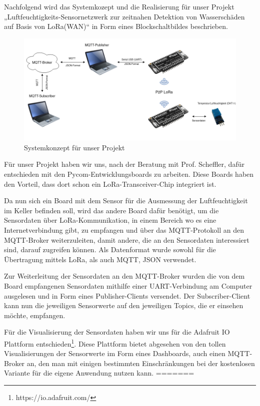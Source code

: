 Nachfolgend wird das Systemkozept und die Realisierung für unser Projekt „Luftfeuchtigkeits-Sensornetzwerk zur zeitnahen Detektion von Wasserschäden auf Basis von LoRa(WAN)“ in Form eines Blockschaltbildes beschrieben. 

\begin{figure}[h]
 \centering
 \includegraphics[width=1\textwidth]{pictures/Blockschaltbild_ProNeSy}
 \caption[Systemkonzept für unser Projekt]{Systemkonzept für unser Projekt}
 \label{fig:systemkonzept}
\end{figure}

Für unser Projekt haben wir uns, nach der Beratung mit Prof. Scheffler, dafür entschieden mit den Pycom-Entwicklungsboards zu arbeiten. Diese Boards haben den Vorteil, dass dort schon ein LoRa-Transceiver-Chip integriert ist. 

Da nun sich ein Board mit dem Sensor für die Ausmessung der Luftfeuchtigkeit im Keller befinden soll, wird das andere Board dafür benötigt, um die Sensordaten über LoRa-Kommunikation, in einem Bereich wo es eine Internetverbindung gibt, zu empfangen und über das MQTT-Protokoll an den MQTT-Broker weiterzuleiten, damit andere, die an den Sensordaten interessiert sind, darauf zugreifen können. Als Datenformat wurde sowohl für die Übertragung mittels LoRa, als auch MQTT, JSON verwendet.

Zur Weiterleitung der Sensordaten an den MQTT-Broker wurden die von dem Board empfangenen Sensordaten mithilfe einer UART-Verbindung am Computer ausgelesen und in Form eines Publisher-Clients versendet. Der Subscriber-Client kann nun die jeweiligen Sensorwerte auf den jeweiligen Topics, die er einsehen möchte, empfangen.

Für die Visualisierung der Sensordaten haben wir uns für die Adafruit IO Plattform entschieden\footnote{https://io.adafruit.com/}. Diese Plattform bietet abgesehen von den tollen Visualisierungen der Sensorwerte im Form eines Dashboards, auch einen MQTT-Broker an, den man mit einigen bestimmten Einschränkungen bei der kostenlosen Variante für die eigene Anwendung nutzen kann. 
=======
%
%
%
%


